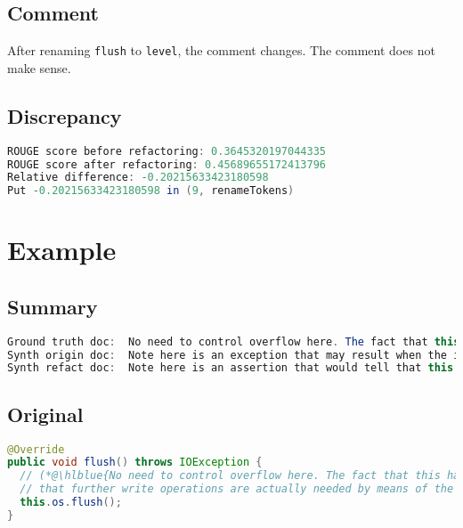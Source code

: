 \documentclass[11pt]{article}
\DeclareRobustCommand{\hlblue}[1]{{\sethlcolor{SeaGreen}\hl{#1}}}
\DeclareRobustCommand{\hlblue}[1]{{\sethlcolor{SkyBlue}\hl{#1}}}
\begin{document}
\subsection{Comment}

After renaming \texttt{flush} to \texttt{level}, the comment changes. The comment does not make sense.

\subsection{Discrepancy}

\begin{lstlisting}[language=java]
ROUGE score before refactoring: 0.3645320197044335
ROUGE score after refactoring: 0.45689655172413796
Relative difference: -0.20215633423180598
Put -0.20215633423180598 in (9, renameTokens)
\end{lstlisting}





\pagebreak
\section{Example}
\subsection{Summary}

\begin{lstlisting}[language=java]
Ground truth doc:  No need to control overflow here. The fact that this has overflow will be used as a flag to determine
Synth origin doc:  Note here is an exception that may result when the implementation checks whether and if the operation succeeds to
Synth refact doc:  Note here is an assertion that would tell that this writer knows now as is in case we detect
\end{lstlisting}

\subsection{Original}
\begin{lstlisting}[language=java]
@Override
public void flush() throws IOException {
  // (*@\hlblue{No need to control overflow here. The fact that this has overflow will be used as a flag to determine}@*)
  // that further write operations are actually needed by means of the isOverflown() method.
  this.os.flush();
}
\end{lstlisting}
\end{document}
